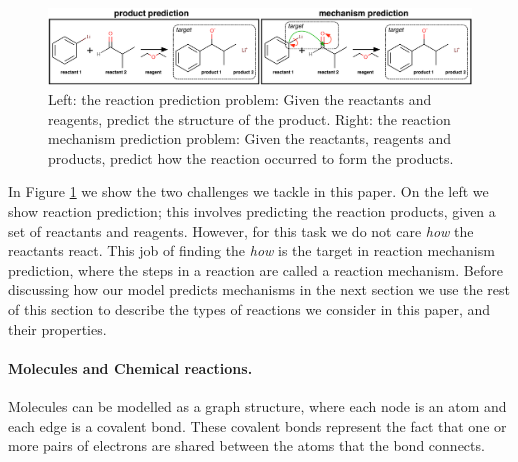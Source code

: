 

\begin{figure}[t!]
\centering
\includegraphics[width=\textwidth]{reaction_diagram}
\caption{Left: the reaction prediction problem: Given the reactants and reagents, predict the structure of the product. Right: the reaction mechanism prediction problem: Given the reactants, reagents and products, predict how the reaction occurred to form the products.}
\label{fig:task-overview}
\end{figure}


In Figure \ref{fig:task-overview} we show the two challenges we tackle in this paper. 
On the left we show reaction prediction; this involves predicting the reaction products, given a set of reactants and reagents. However, for this task we do not care {\em how} the reactants react.
 This job of finding the {\em how} is the target in reaction mechanism prediction, where the steps in a reaction are called a reaction mechanism.
 Before discussing how our model predicts mechanisms in the next section we use the rest of this section to describe the types of reactions we consider in this paper, and their properties.


\paragraph{Molecules and Chemical reactions.}


Molecules can be modelled as a graph structure, where each node is an atom and each edge is a covalent bond.
These covalent bonds represent the fact that 
one or more pairs of electrons are shared between the atoms that the bond connects. 


